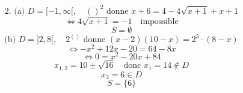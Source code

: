 \documentclass{article}
\begin{document}
\[
\text{2. (a) } D = [-1, \infty[, \quad ( )^2 \text{ donne } x+6 = 4 - 4\sqrt{x+1} + x+1
\]
\[
\Leftrightarrow 4\sqrt{x+1} = -1 \quad \text{impossible}
\]
\[
S = \emptyset
\]
\[
\text{(b) } D = ]2, 8[, \quad 2^{( )} \text{ donne } (x-2)(10-x) = 2^3 \cdot (8-x)
\]
\[
\Leftrightarrow -x^2 + 12x - 20 = 64 - 8x
\]
\[
\Leftrightarrow 0 = x^2 - 20x + 84
\]
\[
x_{1,2} = 10 \pm \sqrt{16} \quad \text{donc } x_1 = 14 \notin D
\]
\[
x_2 = 6 \in D
\]
\[
S = \{6\}
\]
\end{document}
